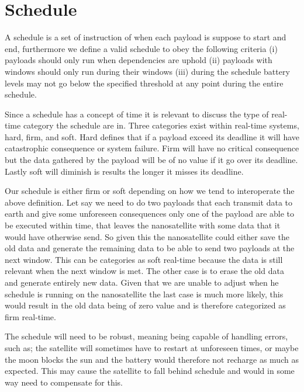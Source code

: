 \section{Schedule} \label{sec:schedule}
A schedule is a set of instruction of when each payload is suppose to start and end, furthermore we define a valid schedule to obey the following criteria (i) payloads should only run when dependencies are uphold (ii) payloads with windows should only run during their windows (iii) during the schedule battery levels may not go below the specified threshold at any point during the entire schedule.

Since a schedule has a concept of time it is relevant to discuss the type of real-time category the schedule are in.
Three categories exist within real-time systems, hard, firm, and soft. Hard defines that if a payload exceed its deadline it will have catastrophic consequence or system failure. Firm will have no critical consequence but the data gathered by the payload will be of no value if it go over its deadline. Lastly soft will diminish is results the longer it misses its deadline. 

Our schedule is either firm or soft depending on how we tend to interoperate the above definition. Let say we need to do two payloads that each transmit data to earth and give some unforeseen consequences only one of the payload are able to be executed within time, that leaves the nanosatellite with some data that it would have otherwise send. So given this the nanosatellite could either save the old data and generate the remaining data to be able to send two payloads at the next window. This can be categories as soft real-time because the data is still relevant when the next window is met. The other case is to erase the old data and generate entirely new data. Given that we are unable to adjust when he schedule is running on the nanosatellite the last case is much more likely, this would result in the old data being of zero value and is therefore categorized as firm real-time.  

The schedule will need to be robust, meaning being capable of handling errors, such as; the satellite will sometimes have to restart at unforeseen times, or maybe the moon blocks the sun and the battery would therefore not recharge as much as expected. This may cause the satellite to fall behind schedule and would in some way need to compensate for this.

